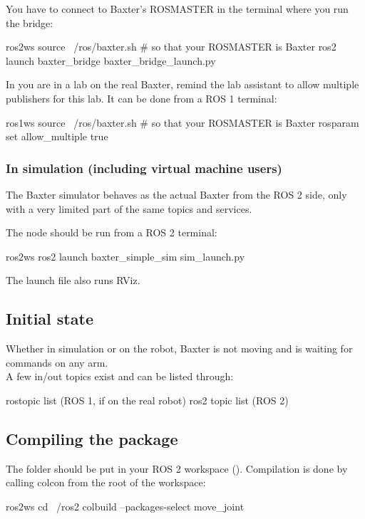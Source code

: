 \documentclass{ecnreport}
\begin{document}
You have to connect to Baxter's ROSMASTER in the terminal where you run the bridge:
\begin{bashcodelarge}
 ros2ws
 source ~/ros/baxter.sh # so that your ROSMASTER is Baxter
 ros2 launch baxter_bridge baxter_bridge_launch.py
\end{bashcodelarge}

In you are in a lab on the real Baxter, remind the lab assistant to allow multiple publishers for this lab.
It can be done from a ROS 1 terminal:
\begin{bashcodelarge}
 ros1ws
 source ~/ros/baxter.sh # so that your ROSMASTER is Baxter
 rosparam set allow_multiple true
\end{bashcodelarge}

\subsubsection{In simulation (including virtual machine users)}

The Baxter simulator behaves as the actual Baxter from the ROS 2 side, only with a very limited part of the same topics and services. 

The  node should be run from a ROS 2 terminal:
\begin{bashcodelarge}
ros2ws
ros2 launch baxter_simple_sim sim_launch.py
\end{bashcodelarge}
The launch file also runs RViz.

\subsection{Initial state}

Whether in simulation or on the robot, Baxter is not moving and is waiting for commands on any arm.\\
A few in/out topics exist and can be listed through:
\begin{bashcodelarge}
rostopic list (ROS 1, if on the real robot)
ros2 topic list (ROS 2)
\end{bashcodelarge}

\subsection{Compiling the package}

The folder should be put in your ROS 2 workspace (). Compilation is done by calling colcon from the root of the workspace:
\begin{bashcodelarge}
 ros2ws
 cd ~/ros2
 colbuild --packages-select move_joint
\end{bashcodelarge}
\end{document}
